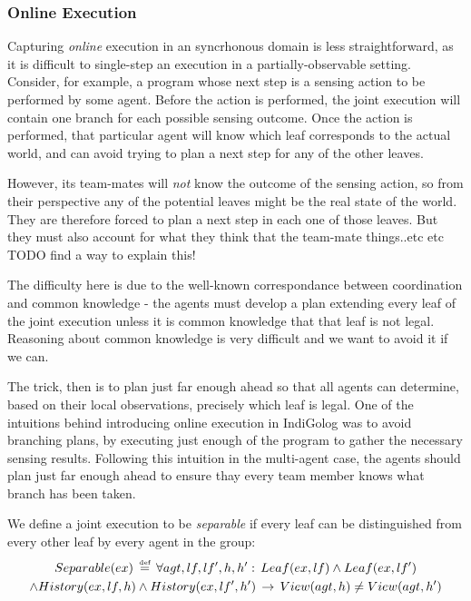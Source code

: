 \subsubsection{Online Execution}

Capturing \emph{online} execution in an syncrhonous domain is less
straightforward, as it is difficult to single-step an execution in
a partially-observable setting. Consider, for example, a program whose
next step is a sensing action to be performed by some agent. Before
the action is performed, the joint execution will contain one branch
for each possible sensing outcome. Once the action is performed, that
particular agent will know which leaf corresponds to the actual world,
and can avoid trying to plan a next step for any of the other leaves.

However, its team-mates will \emph{not }know the outcome of the sensing
action, so from their perspective any of the potential leaves might
be the real state of the world. They are therefore forced to plan
a next step in each one of those leaves. But they must also account
for what they think that the team-mate things..etc etc TODO find a
way to explain this!

The difficulty here is due to the well-known correspondance between
coordination and common knowledge - the agents must develop a plan
extending every leaf of the joint execution unless it is common knowledge
that that leaf is not legal. Reasoning about common knowledge is very
difficult and we want to avoid it if we can.

The trick, then is to plan just far enough ahead so that all agents
can determine, based on their local observations, precisely which
leaf is legal. One of the intuitions behind introducing online execution
in IndiGolog was to avoid branching plans, by executing just enough
of the program to gather the necessary sensing results. Following
this intuition in the multi-agent case, the agents should plan just
far enough ahead to ensure thay every team member knows what branch
has been taken.

We define a joint execution to be \emph{separable} if every leaf can
be distinguished from every other leaf by every agent in the group:\begin{multline*}
Separable(ex)\,\stackrel{\mbox{\tiny def}}{=}\,\forall agt,lf,lf',h,h':\, Leaf(ex,lf)\wedge Leaf(ex,lf')\\
\wedge History(ex,lf,h)\wedge History(ex,lf',h')\,\rightarrow\, View(agt,h)\neq View(agt,h')\end{multline*}
 

